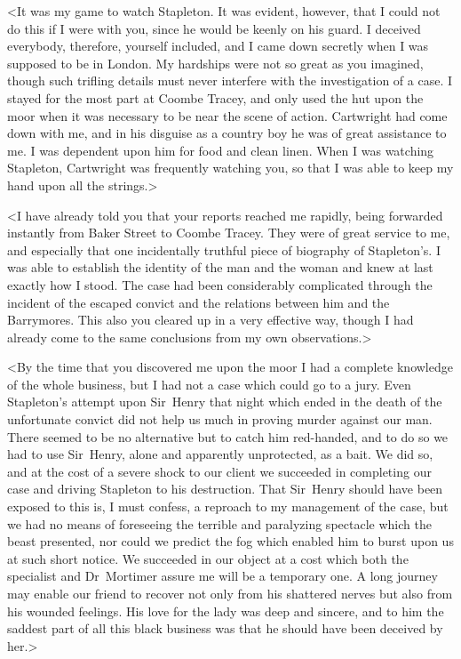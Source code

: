 <It was my game to watch Stapleton. It was evident, however, that I could not do this if I were with you, since he would be keenly on his guard. I deceived everybody, therefore, yourself included, and I came down secretly when I was supposed to be in London. My hardships were not so great as you imagined, though such trifling details must never interfere with the investigation of a case. I stayed for the most part at Coombe Tracey, and only used the hut upon the moor when it was necessary to be near the scene of action. Cartwright had come down with me, and in his disguise as a country boy he was of great assistance to me. I was dependent upon him for food and clean linen. When I was watching Stapleton, Cartwright was frequently watching you, so that I was able to keep my hand upon all the strings.>

<I have already told you that your reports reached me rapidly, being forwarded instantly from Baker Street to Coombe Tracey. They were of great service to me, and especially that one incidentally truthful piece of biography of Stapleton's. I was able to establish the identity of the man and the woman and knew at last exactly how I stood. The case had been considerably complicated through the incident of the escaped convict and the relations between him and the Barrymores. This also you cleared up in a very effective way, though I had already come to the same conclusions from my own observations.>

<By the time that you discovered me upon the moor I had a complete knowledge of the whole business, but I had not a case which could go to a jury. Even Stapleton's attempt upon Sir~Henry that night which ended in the death of the unfortunate convict did not help us much in proving murder against our man. There seemed to be no alternative but to catch him red-handed, and to do so we had to use Sir~Henry, alone and apparently unprotected, as a bait. We did so, and at the cost of a severe shock to our client we succeeded in completing our case and driving Stapleton to his destruction. That Sir~Henry should have been exposed to this is, I must confess, a reproach to my management of the case, but we had no means of foreseeing the terrible and paralyzing spectacle which the beast presented, nor could we predict the fog which enabled him to burst upon us at such short notice. We succeeded in our object at a cost which both the specialist and Dr~Mortimer assure me will be a temporary one. A long journey may enable our friend to recover not only from his shattered nerves but also from his wounded feelings. His love for the lady was deep and sincere, and to him the saddest part of all this black business was that he should have been deceived by her.>

